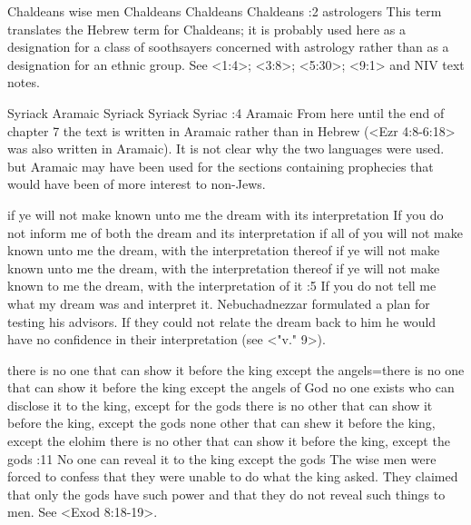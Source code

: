     {Chaldeans} %
    {wise men} %
    {Chaldeans} %
    {Chaldeans} %
    {Chaldeans} %
:2 {astrologers} This term translates the Hebrew term for 
Chaldeans; it is probably used here as a designation for a class of 
soothsayers concerned with astrology rather than as a designation 
for an ethnic group. See <1:4>; <3:8>; <5:30>; <9:1>
and NIV text notes.

    {Syriack} %
    {Aramaic} %
    {Syriack} %
    {Syriack} %
    {Syriac} %
:4 {Aramaic} From here until the end of chapter 7 the text is written in Aramaic rather than in
Hebrew (<Ezr 4:8-6:18> was also written in Aramaic). It is not clear why the two languages were used. 
but Aramaic may have been used for the sections containing 
prophecies that would have been of more interest to non-Jews.

    {if ye will not make known unto me the dream with its interpretation} %
    {If you do not inform me of both the dream and its interpretation} %
    {if all of you will not make known unto me the dream, with the interpretation thereof} %
    {if ye will not make known unto me the dream, with the interpretation thereof} %
    {if ye will not make known to me the dream, with the interpretation of it} %
:5 {If you do not tell me what my dream was and interpret it. }
Nebuchadnezzar formulated a plan for testing his advisors. If they 
could not relate the dream back to him he would have no confidence in their interpretation (see <"v." 9>).


    {there is no one that can show it before the king except the angels}={there is no one that can show it before the king except the angels of God} %
    {no one exists who can disclose it to the king, except for the gods} %
    {there is no other that can show it before the king, except the gods} %
    {none other that can shew it before the king, except the elohim} %
    {there is no other that can show it before the king, except the gods} %
:11 {No one can reveal it to the king except the gods} The 
wise men were forced to confess that they were unable to do what 
the king asked. They claimed that only the gods have such power 
and that they do not reveal such things to men. See <Exod 8:18-19>. 

